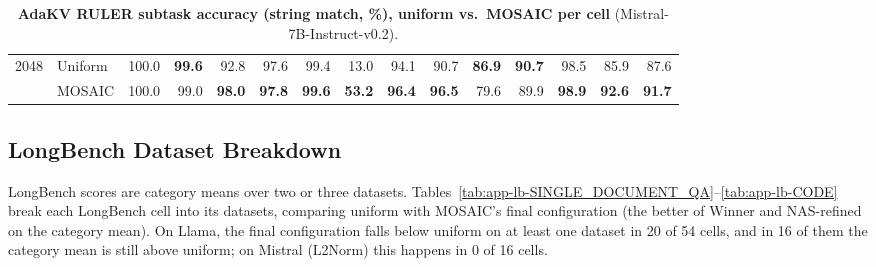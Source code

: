 \begin{table}[tp]
\begin{tabular}{@{} c l rrrrrrrrrrrrr @{}}
    \cmidrule(l){1-15}
    \multirow{2}{*}{2048} & Uniform & 100.0 & \textbf{99.6} & 92.8 & 97.6 & 99.4 & 13.0 & 94.1 & 90.7 & \textbf{86.9} & \textbf{90.7} & 98.5 & 85.9 & 87.6 \\
     & MOSAIC & 100.0 & 99.0 & \textbf{98.0} & \textbf{97.8} & \textbf{99.6} & \textbf{53.2} & \textbf{96.4} & \textbf{96.5} & 79.6 & 89.9 & \textbf{98.9} & \textbf{92.6} & \textbf{91.7} \\
    \bottomrule
  \end{tabular}
  \caption{\textbf{AdaKV RULER subtask accuracy (string match, \%), uniform vs.\ MOSAIC per cell} (Mistral-7B-Instruct-v0.2).}
  \label{tab:app-ruler-mistral-2}
\end{table}


\subsection{LongBench Dataset Breakdown}
\label{app:dataset-reg}

LongBench scores are category means over two or three datasets. Tables~\ref{tab:app-lb-SINGLE_DOCUMENT_QA}--\ref{tab:app-lb-CODE} break each LongBench cell into its datasets, comparing uniform with MOSAIC's final configuration (the better of Winner and NAS-refined on the category mean). On Llama, the final configuration falls below uniform on at least one dataset in 20 of 54 cells, and in 16 of them the category mean is still above uniform; on Mistral (L2Norm) this happens in 0 of 16 cells.

